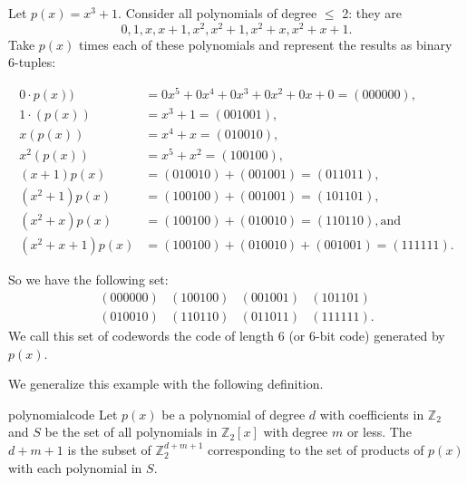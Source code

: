 \begin{example}{}
Let $p(x) = x^3 + 1$.  Consider all polynomials of degree $\le$ 2: they are \[0, 1, x, x+1, x^2, x^2+1, x^2 + x, x^2 + x + 1.\]  Take $p(x)$ times each of these polynomials and represent the results as binary 6-tuples:

\begin{align*}
0\cdot p(x))&=0x^5+0x^4+0x^3+0x^2+0x+0=(000000),\\
1\cdot (p(x))&= x^3 + 1=(001001),\\ 
x(p(x))&=x^4+x= (010010),\\
x^2(p(x))&=x^5+x^2=(100100),\\
(x+1)p(x)&=(010010)+(001001)=(011011),\\
(x^2+1)p(x)&=(100100)+(001001)=(101101),\\ 
(x^2+x)p(x)&=(100100)+(010010)=(110110), \textrm{and}\\
(x^2+x+1)p(x)&=(100100)+(010010)+(001001)=(111111).
\end{align*}

So we have the following set:
 \[ \begin{array}{cccc}
(000000) & (100100) & (001001) & (101101) \\
(010010) & (110110) & (011011) & (111111).
\end{array}\]
We call this set of codewords the code of length 6 (or 6-bit code) generated by $p(x)$.
\end {example}

We generalize this example with the following definition.

\begin{defn}{polynomialcode}
Let $p(x)$ be a polynomial of degree $d$ with coefficients in $\mathbb{Z}_2$ and $S$ be the set of all polynomials in $\mathbb{Z}_2[x]$ with  degree $m$ or less. The   $d+m+1$  is the subset of $\mathbb{Z}_2^{d+m+1}$ corresponding to the set of products of $p(x)$ with each polynomial in $S$. 
\end {defn}

